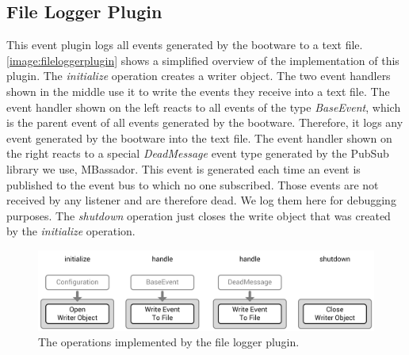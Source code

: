 \subsection{File Logger Plugin}

This event plugin logs all events generated by the bootware to a text file.
\autoref{image:fileloggerplugin} shows a simplified overview of the implementation of this plugin.
The \textit{initialize} operation creates a writer object.
The two event handlers shown in the middle use it to write the events they receive into a text file.
The event handler shown on the left reacts to all events of the type \textit{BaseEvent}, which is the parent event of all events generated by the bootware.
Therefore, it logs any event generated by the bootware into the text file.
The event handler shown on the right reacts to a special \textit{DeadMessage} event type generated by the PubSub library we use, MBassador.
This event is generated each time an event is published to the event bus to which no one subscribed.
Those events are not received by any listener and are therefore dead.
We log them here for debugging purposes.
The \textit{shutdown} operation just closes the write object that was created by the \textit{initialize} operation.

\begin{figure}[!htbp]
	\centering
	\includegraphics[resolution=600]{implementation/assets/filelogger_plugin}
	\caption{The operations implemented by the file logger plugin.}
	\label{image:fileloggerplugin}
\end{figure}
